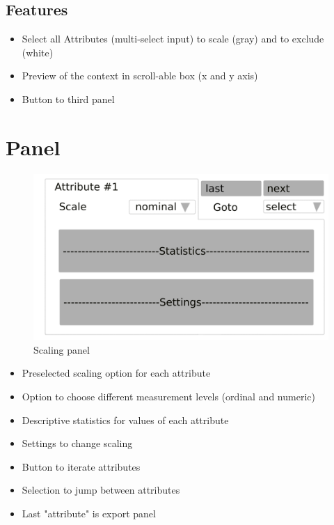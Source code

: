 \documentclass[]{article}
\begin{document}
\subsection{Features}
\begin{itemize}
	\item Select all Attributes (multi-select input) to scale (gray) and to exclude (white)
	\item Preview of the context in scroll-able box (x and y axis)
	\item Button to third panel
\end{itemize}

\newpage
\section{Panel}
\begin{figure}[H]
	\includegraphics[width=\linewidth]{panel-3.png}
	\caption{Scaling panel}
	\label{fig:p2}
\end{figure}
\begin{itemize}
	\item Preselected scaling option for each attribute
	\item Option to choose different measurement levels (ordinal and numeric)
	\item Descriptive statistics for values of each attribute
	\item Settings to change scaling
	\item Button to iterate attributes
	\item Selection to jump between attributes
	\item Last "attribute" is export panel
\end{itemize}
\end{document}
